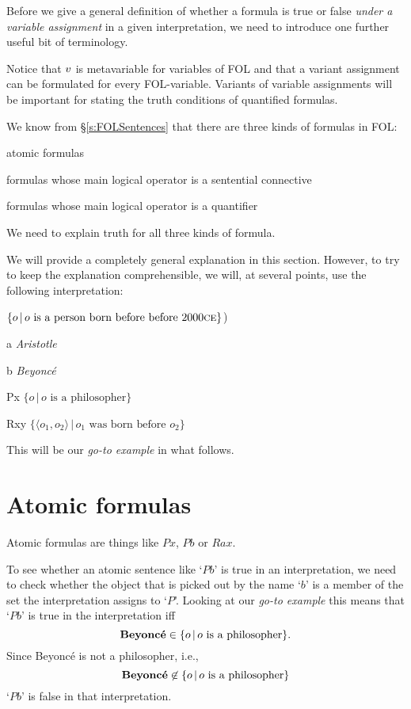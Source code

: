 Before we give a general definition of whether a formula is true or false \emph{under a variable assignment} in a given interpretation, we need to introduce one further useful bit of terminology.

Notice that $\metav$ is metavariable for variables of FOL and that a variant assignment can be formulated for every FOL-variable. Variants of variable assignments will be important for stating the truth conditions of quantified formulas.

We know from \S\ref{s:FOLSentences} that there are three kinds of formulas in FOL:
	\begin{ebullet}
		\item atomic formulas
		\item formulas whose main logical operator is a sentential connective
		\item formulas whose main logical operator is a quantifier
	\end{ebullet}
We need to explain truth for all three kinds of formula.

We will provide a completely general explanation in this section. However, to try to keep the explanation comprehensible, we will, at several points, use the following interpretation:
	\begin{ekey}
		\item[\text{domain}]$\{o\,|\,o\text{ is a person born before before 2000\textsc{ce}}\}$)
		\item[a] \emph{Aristotle}
		\item[b] \emph{Beyonc\'e}
		\item[Px] $\{o\,|\,o\text{ is a philosopher}\}$
		\item[Rxy] $\{\langle o_1,o_2\rangle\,|\,o_1\text{ was born before }o_2\}$
	\end{ekey}
This will be our \emph{go-to example} in what follows.
%
\section{Atomic formulas}\label{s:traf}
Atomic formulas are things like $Px$, $Pb$ or $Rax$.

To see whether an atomic sentence like `$Pb$' is true in an interpretation, we need to check whether the object that is picked out by the name `$b$' is a member of the set the interpretation assigns to `$P$'. Looking at our \emph{go-to example} this means that `$Pb$' is true in the interpretation iff $$\text{\emph{Beyonc\'e}}\in\{o\,|\,o\text{ is a philosopher}\}.$$
Since Beyonc\'e is not a philosopher, i.e., 
$$\text{\emph{Beyonc\'e}}\not\in\{o\,|\,o\text{ is a philosopher}\}$$
`$Pb$' is false in that interpretation.


